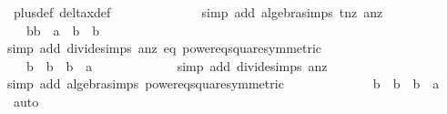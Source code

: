 \begin{isabellebody}
\ {\isasymdelta}{\isacharunderscore}plus{\isacharunderscore}def\ delta{\isacharunderscore}x{\isacharunderscore}def\ \isanewline
\ \ \ \ \ \ \ \ \ \ \ \ \isamarkupfalse%
{\isacharparenleft}simp\ add{\isacharcolon}\ algebra{\isacharunderscore}simps\ t{\isacharunderscore}nz\ a{}{\isacharunderscore}nz{\isacharparenright}\isanewline
\ \ \ \ \ \ \ \ \ \ \isamarkupfalse%
\ \isamarkupfalse%
\ {\isachardoublequoteopen}{\isachardot}{\isachardot}{\isachardot}\ {\isacharequal}\ b{}{\isacharasterisk}b{}\ {\isacharminus}\ a{}{\isacharcircum}{}\ {\isacharasterisk}\ {\isacharparenleft}b{}\ {\isacharslash}\ b{}{\isacharparenright}{\isachardoublequoteclose}\ \isanewline
\ \ \ \ \ \ \ \ \ \ \ \ \isamarkupfalse%
{\isacharparenleft}simp\ add{\isacharcolon}\ divide{\isacharunderscore}simps\ a{}{\isacharunderscore}nz\ eq{}\ power{}{\isacharunderscore}eq{\isacharunderscore}square{\isacharbrackleft}symmetric{\isacharbrackright}{\isacharparenright}\isanewline
\ \ \ \ \ \ \ \ \ \ \isamarkupfalse%
\ \isamarkupfalse%
\ {\isachardoublequoteopen}{\isachardot}{\isachardot}{\isachardot}\ {\isacharequal}\ {\isacharparenleft}b{}\ {\isacharslash}\ b{}{\isacharparenright}\ {\isacharasterisk}\ {\isacharparenleft}b{}{\isacharcircum}{}\ {\isacharminus}\ a{}{\isacharcircum}{}{\isacharparenright}{\isachardoublequoteclose}\isanewline
\ \ \ \ \ \ \ \ \ \ \ \ \isamarkupfalse%
{\isacharparenleft}simp\ add{\isacharcolon}\ divide{\isacharunderscore}simps\ a{}{\isacharunderscore}nz{\isacharparenright}\isanewline
\ \ \ \ \ \ \ \ \ \ \ \ \isamarkupfalse%
{\isacharparenleft}simp\ add{\isacharcolon}\ algebra{\isacharunderscore}simps\ power{}{\isacharunderscore}eq{\isacharunderscore}square{\isacharbrackleft}symmetric{\isacharbrackright}{\isacharparenright}\isanewline
\ \ \ \ \ \ \ \ \ \ \isamarkupfalse%
\ \isamarkupfalse%
\ {\isachardoublequoteopen}{\isacharparenleft}b{}\ {\isacharslash}\ b{}{\isacharparenright}\ {\isacharasterisk}\ {\isacharparenleft}b{}{\isacharcircum}{}\ {\isacharminus}\ a{}{\isacharcircum}{}{\isacharparenright}\ {\isacharequal}\ {}{\isachardoublequoteclose}\ \isamarkupfalse%
\ auto\isanewline
\ \ \ \ \ \ \ \ \ \ \isamarkupfalse%

\end{isabellebody}

